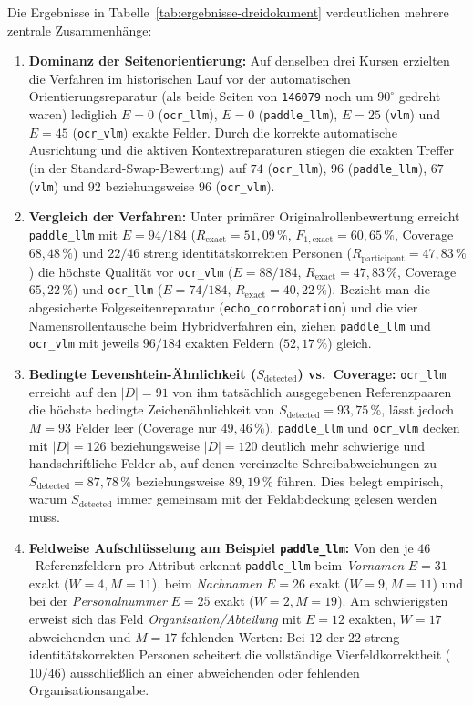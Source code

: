 Die Ergebnisse in Tabelle~\ref{tab:ergebnisse-dreidokument} verdeutlichen mehrere zentrale Zusammenhänge:
\begin{enumerate}
  \item \textbf{Dominanz der Seitenorientierung:} Auf denselben drei Kursen erzielten die Verfahren im historischen Lauf vor der automatischen Orientierungsreparatur (als beide Seiten von \texttt{146079} noch um $90^\circ$ gedreht waren) lediglich $E = 0$ (\texttt{ocr\_llm}), $E = 0$ (\texttt{paddle\_llm}), $E = 25$ (\texttt{vlm}) und $E = 45$ (\texttt{ocr\_vlm}) exakte Felder. Durch die korrekte automatische Ausrichtung und die aktiven Kontextreparaturen stiegen die exakten Treffer (in der Standard-Swap-Bewertung) auf $74$ (\texttt{ocr\_llm}), $96$ (\texttt{paddle\_llm}), $67$ (\texttt{vlm}) und $92$ beziehungsweise $96$ (\texttt{ocr\_vlm}).
  \item \textbf{Vergleich der Verfahren:} Unter primärer Originalrollenbewertung erreicht \texttt{paddle\_llm} mit $E = 94/184$ ($R_{\mathrm{exact}} = 51{,}09\,\%$, $F_{1,\mathrm{exact}} = 60{,}65\,\%$, Coverage $68{,}48\,\%$) und $22/46$ streng identitätskorrekten Personen ($R_{\mathrm{participant}} = 47{,}83\,\%$) die höchste Qualität vor \texttt{ocr\_vlm} ($E = 88/184$, $R_{\mathrm{exact}} = 47{,}83\,\%$, Coverage $65{,}22\,\%$) und \texttt{ocr\_llm} ($E = 74/184$, $R_{\mathrm{exact}} = 40{,}22\,\%$). Bezieht man die abgesicherte Folgeseitenreparatur (\texttt{echo\_corroboration}) und die vier Namensrollentausche beim Hybridverfahren ein, ziehen \texttt{paddle\_llm} und \texttt{ocr\_vlm} mit jeweils $96/184$ exakten Feldern ($52{,}17\,\%$) gleich.
  \item \textbf{Bedingte Levenshtein-Ähnlichkeit ($S_{\mathrm{detected}}$) vs.\ Coverage:} \texttt{ocr\_llm} erreicht auf den $|D| = 91$ von ihm tatsächlich ausgegebenen Referenzpaaren die höchste bedingte Zeichenähnlichkeit von $S_{\mathrm{detected}} = 93{,}75\,\%$, lässt jedoch $M = 93$ Felder leer (Coverage nur $49{,}46\,\%$). \texttt{paddle\_llm} und \texttt{ocr\_vlm} decken mit $|D| = 126$ beziehungsweise $|D| = 120$ deutlich mehr schwierige und handschriftliche Felder ab, auf denen vereinzelte Schreibabweichungen zu $S_{\mathrm{detected}} = 87{,}78\,\%$ beziehungsweise $89{,}19\,\%$ führen. Dies belegt empirisch, warum $S_{\mathrm{detected}}$ immer gemeinsam mit der Feldabdeckung gelesen werden muss.
  \item \textbf{Feldweise Aufschlüsselung am Beispiel \texttt{paddle\_llm}:} Von den je $46$~Referenzfeldern pro Attribut erkennt \texttt{paddle\_llm} beim \emph{Vornamen} $E=31$ exakt ($W=4, M=11$), beim \emph{Nachnamen} $E=26$ exakt ($W=9, M=11$) und bei der \emph{Personalnummer} $E=25$ exakt ($W=2, M=19$). Am schwierigsten erweist sich das Feld \emph{Organisation/Abteilung} mit $E=12$ exakten, $W=17$ abweichenden und $M=17$ fehlenden Werten: Bei $12$ der $22$ streng identitätskorrekten Personen scheitert die vollständige Vierfeldkorrektheit ($10/46$) ausschließlich an einer abweichenden oder fehlenden Organisationsangabe.
\end{enumerate}


